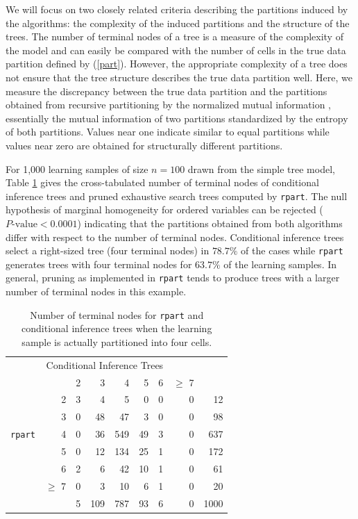 We will focus on two closely related criteria describing the partitions
induced by the algorithms: the complexity of the induced partitions and the
structure of the trees. 
The number of terminal nodes of a tree 
is a measure of the complexity of the model and can easily be compared with
the number of cells in the true data partition defined by (\ref{part}). 
However, the appropriate complexity of a tree does not ensure that the
tree structure describes the true data partition well. 
Here, we measure the discrepancy between the true data partition and 
the partitions obtained from recursive partitioning by the
normalized mutual information \citep[`NMI', ][]{StrehlGhosh2002}, essentially
the mutual information of two partitions standardized by the
entropy of both partitions. Values near one indicate similar to equal   
partitions while values near zero are obtained for structurally different
partitions.

For 1,000 learning samples of size $n = 100$ drawn from the simple tree model,
Table \ref{nodes} gives the cross-tabulated
number of terminal nodes of conditional inference trees and pruned
exhaustive search trees computed by \texttt{rpart}. The null hypothesis of
marginal homogeneity for ordered variables \citep{Agresti2002} 
can be rejected ($P\text{-value} <
0.0001$) indicating that the partitions obtained from both algorithms differ
with respect to the number of terminal nodes.
Conditional inference trees select a right-sized tree (four
terminal nodes) in $78.7\%$ of the cases while \texttt{rpart} generates
trees with four terminal nodes for $63.7\%$ of the learning samples. 
In general, pruning as
implemented in \texttt{rpart} tends to produce trees with a larger number of
terminal nodes in this example. 

\begin{table}
\begin{center}
\begin{tabular}{lrrrrrrr|r}
      & \multicolumn{6}{r}{Conditional Inference Trees} & \\
& & 2 & 3 & 4 & 5 & 6 & $\ge$ 7 & \\
& 2 & 3 & 4 & 5 & 0 & 0 & 0 & 12 \\
& 3 & 0 & 48 & 47 & 3 & 0 & 0 & 98 \\
\texttt{rpart} & 4 & 0 & 36 & 549 & 49 & 3 & 0 & 637 \\
& 5 & 0 & 12 & 134 & 25 & 1 & 0 & 172 \\
& 6 & 2 & 6 & 42 & 10 & 1 & 0 & 61 \\
& $\ge$ 7 & 0 & 3 & 10 & 6 & 1 & 0 & 20 \\ \hline
 &  & 5 & 109 & 787 & 93 & 6 & 0 & 1000 \\
\end{tabular}
\caption{Number of terminal nodes for \texttt{rpart} and conditional
         inference trees when the learning sample is actually partitioned into four
         cells. \label{nodes}}
\end{center}
\end{table}

